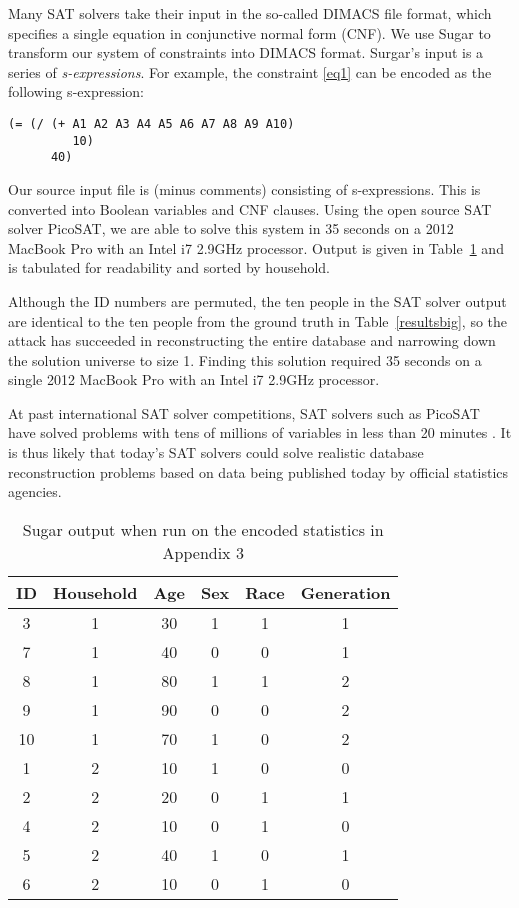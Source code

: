 \documentclass[runningheads]{llncs}
\begin{document}
Many SAT solvers take their input in the so-called DIMACS file format,
which specifies a single equation in conjunctive normal form (CNF). We use
Sugar\cite{sugar} to transform our system of constraints into DIMACS
format. Surgar's input is a series of
\textit{s-expressions}\cite{McCarthy:1960:RFS:367177.367199}. For
example, the constraint \ref{eq1} can be encoded as the following
s-expression:
\begin{verbatim}
(= (/ (+ A1 A2 A3 A4 A5 A6 A7 A8 A9 A10) 
         10) 
      40)
\end{verbatim}

Our source input file is \NumConstraintLines{} (minus comments)
consisting of \NumSExpressions s-expressions. This is converted into
\NumVariables Boolean variables and \NumClauses CNF clauses. Using the
open source SAT solver PicoSAT\cite{Biere_picosatessentials}, we are able
to solve this system in 35 seconds on a 2012 MacBook Pro with an Intel
i7 2.9GHz processor. Output is given in Table~\ref{sugarbig} and is
tabulated for readability and sorted by household. 

Although the ID numbers are permuted, the ten people in the SAT
solver output are identical to the ten people from the ground truth in
Table~\ref{resultsbig}, so the attack has succeeded in reconstructing
the entire database and narrowing down the solution universe to size
1. Finding this solution required 35 seconds on a single 2012 MacBook
Pro with an Intel i7 2.9GHz processor. 

At past international SAT
solver competitions, SAT solvers such as PicoSAT have solved problems
with tens of millions of variables in less than 20 minutes
\cite{satcomp}. It is thus likely that today's SAT solvers could solve
realistic database reconstruction problems based on data being
published today by official statistics agencies.


\begin{table}
\begin{tabular}{c|c|c|c|c|c}
ID & Household & Age & Sex & Race & Generation \\
\hline
 3 & 1 & 30 & 1 & 1 & 1  \\
 7 & 1 & 40 & 0 & 0 & 1  \\
 8 & 1 & 80 & 1 & 1 & 2  \\
 9 & 1 & 90 & 0 & 0 & 2 \\
10 & 1 & 70 & 1 & 0 & 2 \\
 1 & 2 & 10 & 1 & 0 & 0  \\
 2 & 2 & 20 & 0 & 1 & 1  \\
 4 & 2 & 10 & 0 & 1 & 0  \\
 5 & 2 & 40 & 1 & 0 & 1  \\
 6 & 2 & 10 & 0 & 1 & 0  \\
\hline
\end{tabular}
\caption{Sugar output when run on the encoded statistics in Appendix 3}\label{sugarbig}
\end{table}
\end{document}
